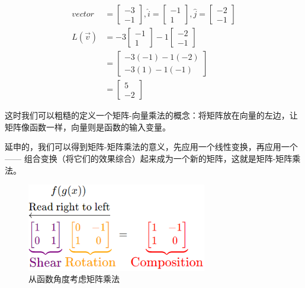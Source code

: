\documentclass[UTF8]{ctexart}
\begin{document}
\begin{align*}
    vector &= \begin{bmatrix} -3 \\ -1 \end{bmatrix}, \hat{i} = \begin{bmatrix} -1 \\ 1\end{bmatrix}, \hat{j} = \begin{bmatrix} -2 \\ -1\end{bmatrix} \\
    L(\vec{v}) &= -3\begin{bmatrix} -1 \\ 1\end{bmatrix} - 1\begin{bmatrix} -2 \\ -1\end{bmatrix} \\
    &= \begin{bmatrix} -3(-1) - 1(-2) \\ -3(1)-1(-1) \end{bmatrix} \\
    &= \begin{bmatrix}
        5 \\ -2
    \end{bmatrix}
\end{align*}

这时我们可以粗糙的定义一个矩阵-向量乘法的概念：将矩阵放在向量的左边，让矩阵像函数一样，向量则是函数的输入变量。

延申的，我们可以得到矩阵-矩阵乘法的意义，先应用一个线性变换，再应用一个 —— 组合变换（将它们的效果综合）起来成为一个新的矩阵，这就是矩阵-矩阵乘法。

\begin{figure}[hb]
    \centering
    \includegraphics[width=0.7\textwidth]{./figs/m_multication.png}
    \caption{从函数角度考虑矩阵乘法}
    \label{fig:m_multication}
\end{figure}
\end{document}
